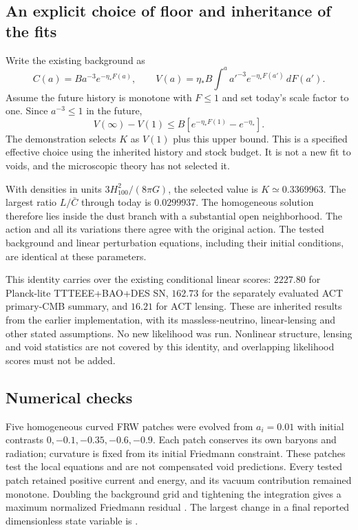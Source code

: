 \documentclass[11pt]{article}
\begin{document}
\subsection{An explicit choice of floor and inheritance of the fits}
Write the existing background as
\begin{equation}
 C(a)=B a^{-3}e^{-\eta_*F(a)},\qquad
 V(a)=\eta_* B\int^a a'^{-3}e^{-\eta_*F(a')}\,dF(a').
\end{equation}
Assume the future history is monotone with $F\le1$ and set today's scale
factor to one. Since $a^{-3}\le1$ in the future,
\begin{equation}
 V(\infty)-V(1)\le B[e^{-\eta_*F(1)}-e^{-\eta_*}].
\end{equation}
The demonstration selects $K$ as $V(1)$ plus this upper bound. This is a
specified effective choice using the inherited history and stock budget.
It is not a new fit to voids, and the microscopic theory has not selected it.

With densities in units $3H_{100}^2/(8\pi G)$, the selected value is
$K\simeq0.3369963$. The largest ratio $L/\bar C$ through today is
$0.0299937$. The homogeneous solution therefore lies inside the dust
branch with a substantial open neighborhood. The action and all its
variations there agree with the original action. The tested background and
linear perturbation equations, including their initial conditions, are
identical at these parameters.

This identity carries over the existing conditional linear scores:
$2227.80$ for Planck-lite TTTEEE+BAO+DES SN, $162.73$ for the separately
evaluated ACT primary-CMB summary, and $16.21$ for ACT lensing. These are
inherited results from the earlier implementation, with its massless-neutrino,
linear-lensing and other stated assumptions. No new likelihood was run.
Nonlinear structure, lensing and void statistics are not covered by this
identity, and overlapping likelihood scores must not be added.

\subsection{Numerical checks}
Five homogeneous curved FRW patches were evolved from $a_i=0.01$ with
initial contrasts $0,-0.1,-0.35,-0.6,-0.9$. Each patch conserves its own
baryons and radiation; curvature is fixed from its initial Friedmann
constraint. These patches test the local equations and are not compensated
void predictions. Every tested patch retained positive current and energy,
and its vacuum contribution remained monotone. Doubling the background grid
and tightening the integration gives a maximum normalized Friedmann residual
\MaxConstraintError. The largest change in a final reported dimensionless
state variable is \MaxPatchDifference.
\end{document}
